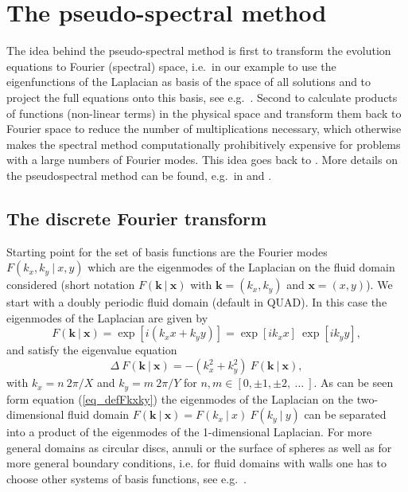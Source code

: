 \chapter{The pseudo-spectral method} \label{sec_pseudspec}
The idea behind the pseudo-spectral method is first to transform
the evolution equations to Fourier (spectral) space, i.e.\ in our
example to use the eigenfunctions of the Laplacian as basis of the
space of all solutions and to project the full equations onto this basis,
see e.g.\ \cite{canutoetal1988}. Second to calculate products of functions
(non-linear terms) in the physical space and transform them back
to Fourier space to reduce the number of multiplications necessary,
which otherwise makes the spectral method computationally prohibitively
expensive for problems with a large numbers of Fourier modes. This idea
goes back to \cite{kreissandoliger1972}. More details on the
pseudospectral method can be found, e.g.\ in \cite{orszag1972}
and \cite{fornberg1987}.

\section{The discrete Fourier transform}
\label{ssec_evolfourier}
Starting point for the set of basis functions are the Fourier modes 
$F(k_{x},k_{y} \ | \ x,y)$ which are the eigenmodes of the Laplacian 
on the fluid domain considered (short notation 
$F(\mathbf{k} \ | \ \mathbf{x})$ with 
$\mathbf{k} = (k_{x},k_{y})$ and $\mathbf{x} = (x,y)$).  
We start with a doubly periodic fluid domain (default in QUAD). 
In this case the eigenmodes of the Laplacian are given by
\begin{equation} \label{eq_defFkxky}
  F(\mathbf{k} \ | \ \mathbf{x}) 
   = 
 \exp \left[ i  \left(k_{x} x + k_{y} y \right) \right]
   = 
 \exp \left[ i k_{x} x \right] \ 
 \exp \left[ i k_{y} y \right],
\end{equation}
and satisfy the eigenvalue equation
\begin{equation} \label{eq_eigFkxky}
 \Delta \ F(\mathbf{k} \ | \ \mathbf{x})
   =
  - \left( k_{x}^{2} + k_{y}^{2} \right) \ 
    F(\mathbf{k} \ | \ \mathbf{x}),
\end{equation}
with $k_{x} = n \ 2 \pi/X$ and $k_{y} = m \ 2 \pi/Y$ for 
$n,m \in [0,\pm 1, \pm 2,\ \dots \ ]$. As can be seen form equation 
(\ref{eq_defFkxky}) the eigenmodes of the Laplacian on the 
two-dimensional fluid domain 
$F(\mathbf{k} \ | \ \mathbf{x}) = F(k_{x} \ | \ x) \ F(k_{y} \ | \ y)$
can be separated into a product of the eigenmodes of the 
1-dimensional Laplacian. For more general domains
as circular discs, annuli or the surface of spheres as well as 
for more general boundary conditions, i.e. for fluid domains with walls 
one has to choose other systems of basis functions, 
see e.g.\ \cite{canutoetal1988}.

